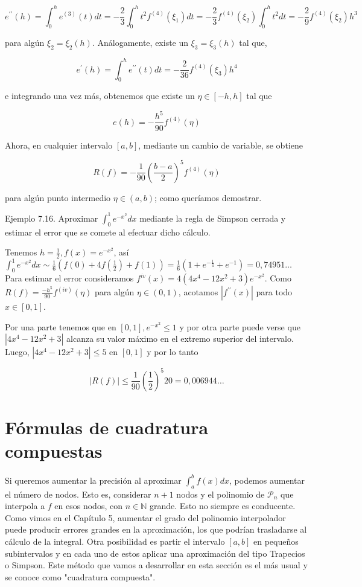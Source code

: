 \documentclass[10pt]{book}
\begin{document}
$$
e^{\prime \prime}(h)=\int_{0}^{h} e^{(3)}(t) d t=-\frac{2}{3} \int_{0}^{h} t^{2} f^{(4)}\left(\xi_{1}\right) d t=-\frac{2}{3} f^{(4)}\left(\xi_{2}\right) \int_{0}^{h} t^{2} d t=-\frac{2}{9} f^{(4)}\left(\xi_{2}\right) h^{3}
$$

para algún $\xi_{2}=\xi_{2}(h)$. Análogamente, existe un $\xi_{3}=\xi_{3}(h)$ tal que,

$$
e^{\prime}(h)=\int_{0}^{h} e^{\prime \prime}(t) d t=-\frac{2}{36} f^{(4)}\left(\xi_{3}\right) h^{4}
$$

e integrando una vez más, obtenemos que existe un $\eta \in[-h, h]$ tal que

$$
e(h)=-\frac{h^{5}}{90} f^{(4)}(\eta)
$$

Ahora, en cualquier intervalo $[a, b]$, mediante un cambio de variable, se obtiene

$$
R(f)=-\frac{1}{90}\left(\frac{b-a}{2}\right)^{5} f^{(4)}(\eta)
$$

para algún punto intermedio $\eta \in(a, b)$; como queríamos demostrar.

Ejemplo 7.16. Aproximar $\int_{0}^{1} e^{-x^{2}} d x$ mediante la regla de Simpson cerrada y estimar el error que se comete al efectuar dicho cálculo.

Tenemos $h=\frac{1}{2}, f(x)=e^{-x^{2}}$, así\\
$\int_{0}^{1} e^{-x^{2}} d x \sim \frac{1}{6}\left(f(0)+4 f\left(\frac{1}{2}\right)+f(1)\right)=\frac{1}{6}\left(1+e^{-\frac{1}{4}}+e^{-1}\right)=0,74951 \ldots$\\
Para estimar el error consideramos $f^{i v}(x)=4\left(4 x^{4}-12 x^{2}+3\right) e^{-x^{2}}$. Como $R(f)=\frac{-h^{5}}{90} f^{(i v)}(\eta)$ para algún $\eta \in(0,1)$, acotamos $\left|f^{\prime \prime}(x)\right|$ para todo $x \in[0,1]$.

Por una parte tenemos que en $[0,1], e^{-x^{2}} \leq 1$ y por otra parte puede verse que $\left|4 x^{4}-12 x^{2}+3\right|$ alcanza su valor máximo en el extremo superior del intervalo. Luego, $\left|4 x^{4}-12 x^{2}+3\right| \leq 5$ en $[0,1]$ y por lo tanto

$$
|R(f)| \leq \frac{1}{90}\left(\frac{1}{2}\right)^{5} 20=0,006944 \ldots
$$

\section{Fórmulas de cuadratura compuestas}
Si queremos aumentar la precisión al aproximar $\int_{a}^{b} f(x) d x$, podemos aumentar el número de nodos. Esto es, considerar $n+1$ nodos y el polinomio de $\mathcal{P}_{n}$ que interpola a $f$ en esos nodos, con $n \in \mathbb{N}$ grande. Esto no siempre es conducente. Como vimos en el Capítulo 5, aumentar el grado del polinomio interpolador puede producir errores grandes en la aproximación, los que podrían trasladarse al cálculo de la integral. Otra posibilidad es partir el intervalo $[a, b]$ en pequeños subintervalos y en cada uno de estos aplicar una aproximación del tipo Trapecios o Simpson. Este método que vamos a desarrollar en esta sección es el más usual y se conoce como "cuadratura compuesta".
\end{document}
